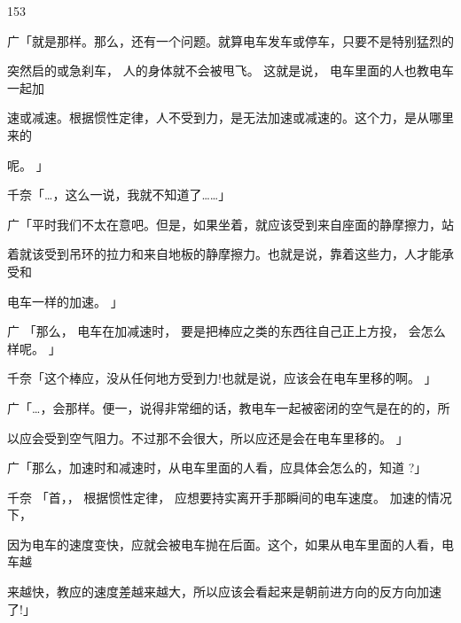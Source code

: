 153\par
广「就是那样。那么，还有一个问题。就算电车发车或停车，只要不是特别猛烈的\par
突然启的或急刹车， 人的身体就不会被甩飞。 这就是说， 电车里面的人也教电车一起加\par
速或减速。根据惯性定律，人不受到力，是无法加速或减速的。这个力，是从哪里来的\par
呢。 」\par
千奈「…，这么一说，我就不知道了……」\par
广「平时我们不太在意吧。但是，如果坐着，就应该受到来自座面的静摩擦力，站\par
着就该受到吊环的拉力和来自地板的静摩擦力。也就是说，靠着这些力，人才能承受和\par
电车一样的加速。 」\par
广 「那么， 电车在加减速时， 要是把棒应之类的东西往自己正上方投， 会怎么样呢。 」\par
千奈「这个棒应，没从任何地方受到力!也就是说，应该会在电车里移的啊。 」\par
广「…，会那样。便一，说得非常细的话，教电车一起被密闭的空气是在的的，所\par
以应会受到空气阻力。不过那不会很大，所以应还是会在电车里移的。 」\par
广「那么，加速时和减速时，从电车里面的人看，应具体会怎么的，知道 ?」\par
千奈 「首，， 根据惯性定律， 应想要持实离开手那瞬间的电车速度。 加速的情况下，\par
因为电车的速度变快，应就会被电车抛在后面。这个，如果从电车里面的人看，电车越\par
来越快，教应的速度差越来越大，所以应该会看起来是朝前进方向的反方向加速了!」\par


